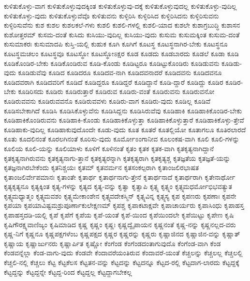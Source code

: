 {ಕುಳಿತುಕೊಳ್ಳು-ವಾಗ
ಕುಳಿತುಕೊಳ್ಳುವುದಕ್ಕಿಂತ
ಕುಳಿತುಕೊಳ್ಳುವು-ದಕ್ಕೆ
ಕುಳಿತುಕೊಳ್ಳುವುದಲ್ಲ
ಕುಳಿತುಕೊಳ್ಳು-ವುದಿಲ್ಲ
ಕುಳಿತುಕೊಳ್ಳು-ವುದು
ಕುಳಿತುಕೊಳ್ಳುವೆವೊ
ಕುಳಿತುವನು
ಕುಳ್ಳಿರಿಸಿ
ಕುಳ್ಳಿರಿಸಿದ
ಕುಳ್ಳಿರಿಸಿದನು
ಕುಳ್ಳಿರಿಸುವನು
ಕುಳ್ಳಿರಿಸುವೆನು
ಕುಶ
ಕುಶಲ
ಕುಶಲಕಲೆ-ಗಳು
ಕುಶಲಿ
ಕುಶಲಿ-ಗಳಲ್ಲಿ
ಕುಶಲಿ-ಯಾದ
ಕುಶಲೇ
ಕುಶಾಗ್ರಬುದ್ಧಿ
ಕುಶಾಸನ
ಕುಶೋತ್ತರಮ್
ಕುಸಮ-ದಂತೆ
ಕುಸಿದು
ಕುಸಿಯು-ವುದಿಲ್ಲ
ಕುಸಿಯು-ವುದು
ಕುಸುಮ
ಕುಸುಮಕ್ಕಿಂತ
ಕುಸುಮ-ದಂತೆ
ಕುಸುಮಾಕರಃ
ಕುಸುಮಾದಪಿ
ಕುಸ್ತಿ-ಯಲ್ಲಿ
ಕುಹುಕ
ಕೂಗಿ
ಕೂಗಿಗೆ
ಕೂಟಸ್ಥ
ಕೂಟಸ್ಥನಾಗಿರ-ಬೇಕು
ಕೂಟಸ್ಥನೂ
ಕೂಟಸ್ಥಮಚಲಂ
ಕೂಟಸ್ಥವೂ
ಕೂಟಸ್ಥೋ
ಕೂಟಸ್ಥೋಽಕ್ಷರ
ಕೂಡ
ಕೂಡದು
ಕೂಡಬಾರದು
ಕೂಡಲೆ
ಕೂಡಾ
ಕೂಡಿ
ಕೂಡಿಕೊಂಡಿರ-ಬೇಕು
ಕೂಡಿಕೊಂಡಿರುವ
ಕೂಡಿ-ಕೊಂಡು
ಕೂಡಿಟ್ಟರೂ
ಕೂಡಿಟ್ಟುಕೊಂಡಿರು
ಕೂಡಿಡುವನು
ಕೂಡಿಡು-ವುದು
ಕೂಡಿಡುವೆವು
ಕೂಡಿದ
ಕೂಡಿದರೂ
ಕೂಡಿದವ-ನಾಗಿ
ಕೂಡಿದವನಾದರೆ
ಕೂಡಿದವನು
ಕೂಡಿದವನೂ
ಕೂಡಿದವರಾಗಿ
ಕೂಡಿದವರಿಗೆ
ಕೂಡಿದೆ
ಕೂಡಿದ್ದರೂ
ಕೂಡಿದ್ದರೆ
ಕೂಡಿದ್ದಾನೆ
ಕೂಡಿ-ದ್ದಾರೆ
ಕೂಡಿದ್ದು
ಕೂಡಿರ
ಕೂಡಿರ-ಬೇಕು
ಕೂಡಿರಿಸದು
ಕೂಡಿರು
ಕೂಡಿರುತ್ತಾರೆ
ಕೂಡಿರುವ
ಕೂಡಿರು-ವಂತೆ
ಕೂಡಿರುವನು
ಕೂಡಿರುವನೋ
ಕೂಡಿರುವವನು
ಕೂಡಿರುವವನೊ
ಕೂಡಿರುವವಳು
ಕೂಡಿರು-ವಾಗ
ಕೂಡಿರು-ವುದು
ಕೂಡಿಲ್ಲ
ಕೂಡಿವೆ
ಕೂಡಿಸಬೇಕಾಗಿದೆ
ಕೂಡಿಸಿ
ಕೂಡಿಸಿಕೊಳ್ಳುವೆನು
ಕೂಡಿಸಿದ್ದನು
ಕೂಡಿಸಿರುವೆವು
ಕೂಡಿಹಾಕಿ
ಕೂಡಿಹಾಕಿಕೊಂಡಿರ-ಬೇಕು
ಕೂಡಿಹಾಕಿಕೊಂಡಿರುವನು
ಕೂಡಿಹಾಕಿ-ಕೊಂಡು
ಕೂಡಿಹಾಕಿಕೊಳ್ಳುತ್ತಾ
ಕೂಡಿಹಾಕಿಕೊಳ್ಳುತ್ತಾರೆ
ಕೂಡಿಹಾಕಿಕೊಳ್ಳು-ತ್ತೇವೆ
ಕೂಡಿಹಾಕು-ವುದಿಲ್ಲ
ಕೂಡಿಹಾಕುವುದೊಂದೇ
ಕೂಡು-ವುದು
ಕೂತ
ಕೂತರೆ
ಕೂತಲ್ಲಿಯೋ
ಕೂತಾಗಲೂ
ಕೂತಿರಲಾರದೆ
ಕೂತು
ಕೂದಲಿನಂತೆ
ಕೂರಲಗಿನಂತೆ
ಕೂರಿಸು-ವುದು
ಕೂರ್ಮೋಽಂಗಾನೀವ
ಕೂಲಂಕಷ-ವಾಗಿ
ಕೂಲಿ
ಕೂಲಿ-ಗಳನ್ನು
ಕೂಲಿಯ
ಕೂಲಿ-ಯನ್ನು
ಕೂಲಿಯಾಳು
ಕೂಳಿಗೆ
ಕೂಳಿನಂತೆ
ಕೃತಂ
ಕೃತಕ
ಕೃತಕ-ವಾಗಿ
ಕೃತಕೃತ್ಯನಾಗಿದ್ದಾನೆ
ಕೃತಕೃತ್ಯನಾಗಿರುವನು
ಕೃತಕೃತ್ಯನಾಗು-ತ್ತಾನೆ
ಕೃತಕೃತ್ಯರನ್ನಾಗಿ
ಕೃತಕೃತ್ಯರಾಗಿ
ಕೃತಕೃತ್ಯಶ್ಚ
ಕೃತಜ್ಞತೆಯ
ಕೃತಜ್ಞತೆ-ಯನ್ನು
ಕೃತಜ್ಞನಾಗಿರಬೇಕೆಂದು
ಕೃತನಿಶ್ಚಯಃ
ಕೃತಮ್
ಕೃತವರ್ಮನ
ಕೃತಸಂಕಲ್ಪರಾಗಿ
ಕೃತಾಂಜಲಿರಭಾಷತ
ಕೃತಾಂಜಲಿರ್ವೇಪಮಾನಃ
ಕೃತಾಂತೇ
ಕೃತಾರ್ಥ
ಕೃತಾರ್ಥನಾಗು-ತ್ತೇನೆ
ಕೃತಾರ್ಥನಾದೆ
ಕೃತಾರ್ಥರಾಗಿ
ಕೃತೇನಾರ್ಥೋ
ಕೃತ್ಯಕೃತ್ಯನೂ
ಕೃತ್ಯಕ್ಕಿಂತ
ಕೃತ್ಯ-ಗಳನ್ನು
ಕೃತ್ಯದ
ಕೃತ್ಯ-ವನ್ನು
ಕೃತ್ವಾ
ಕೃತ್ವಾಪಿ
ಕೃತ್ಸ್ನ
ಕೃತ್ಸ್ನಂ
ಕೃತ್ಸ್ನಮಧರ್ಮೋಭಿಭವತ್ಯುತ
ಕೃತ್ಸ್ನಮಧ್ಯಾತ್ಮಂ
ಕೃತ್ಸ್ನಮವಶಂ
ಕೃತ್ಸ್ನಮೇಕಾಂಶೇನ
ಕೃತ್ಸ್ನವದೇಕಸ್ಮಿನ್
ಕೃತ್ಸ್ನವಿನ್ನ
ಕೃತ್ಸ್ನಸ್ಯ
ಕೃಪ
ಕೃಪಣರು
ಕೃಪಣಾಃ
ಕೃಪನೇ
ಕೃಪಯಾ
ಕೃಪಯಾವಿಷ್ಟಮಶ್ರುಪೂರ್ಣಾಕುಲೇಕ್ಷಣಮ್
ಕೃಪಶ್ಚ
ಕೃಪಾಕಟಾಕ್ಷವೇ
ಕೃಪಾಚಾರ್ಯರು
ಕೃಪಾಸಿಂಧು
ಕೃಪಾಹಸ್ತ
ಕೃಪಾಹಸ್ತದಡಿ-ಯಲ್ಲಿ
ಕೃಪೆ
ಕೃಪೆಗೆ
ಕೃಪೆಯ
ಕೃಪೆ-ಯಂತೆ
ಕೃಪೆ-ಯಿಂದ
ಕೃಪೆಯಿಂದಲೇ
ಕೃಪೆಯಿಟ್ಟು
ಕೃಪೇಣ
ಕೃಷಿ
ಕೃಷಿಗೌರಕ್ಷ್ಯವಾಣಿಜ್ಯಂ
ಕೃಷಿಮಾಡಿದ
ಕೃಷ್ಣ
ಕೃಷ್ಣಂ
ಕೃಷ್ಣಃ
ಕೃಷ್ಣದ್ವೈಪಾಯನ
ಕೃಷ್ಣನಂತೆ
ಕೃಷ್ಣ-ನನ್ನು
ಕೃಷ್ಣನಲ್ಲದ-ವರು
ಕೃಷ್ಣ-ನಿಗೆ
ಕೃಷ್ಣನೂ
ಕೃಷ್ಣಪಕ್ಷಗಳೆಂಬ
ಕೃಷ್ಣಪಕ್ಷದ
ಕೃಷ್ಣರ
ಕೃಷ್ಣರನ್ನು
ಕೃಷ್ಣರು
ಕೃಷ್ಣಾಜಿನದ
ಕೃಷ್ಣಾಜಿನ-ವನ್ನು
ಕೃಷ್ಣಾತ್
ಕೃಷ್ಣಾಯ
ಕೃಷ್ಣಾರ್ಜುನರು
ಕೃಷ್ಣಾರ್ಪಿತ
ಕೃಷ್ಣೋ
ಕೆಂಗೆಂಡ
ಕೆಂಗೆಂಡದಂತಾಗುವುದೊ
ಕೆಂಗೆಂಡ-ವಾಗಿ
ಕೆಂಡ
ಕೆಂಡವನ್ನೆಲ್ಲಾ
ಕೆಂಡ-ವಾಗು-ವುದು
ಕೆಂಡವೇ
ಕೆಂದಾವರೆಯಂತಿರುವ
ಕೆಂದಾವರೆ-ಯಂತೆ
ಕೆಚ್ಚಲನ್ನು
ಕೆಚ್ಚಲಲ್ಲ
ಕೆಚ್ಚಲಲ್ಲಿ
ಕೆಚ್ಚಲಿ-ನಲ್ಲಿ
ಕೆಚ್ಚಲು
ಕೆಟ್ಟ
ಕೆಟ್ಟಕೆಲಸ
ಕೆಟ್ಟತನ-ವನ್ನು
ಕೆಟ್ಟದನ್ನು
ಕೆಟ್ಟದನ್ನೂ
ಕೆಟ್ಟದ-ರಲ್ಲಿ
ಕೆಟ್ಟದಾಗ-ಲಾರದು
ಕೆಟ್ಟದ್ದಕ್ಕೆ
ಕೆಟ್ಟದ್ದನ್ನು
ಕೆಟ್ಟದ್ದನ್ನೇ
ಕೆಟ್ಟದ್ದ-ರಿಂದ
ಕೆಟ್ಟದ್ದಲ್ಲ
ಕೆಟ್ಟದ್ದಾಗಬೇಕಲ್ಲ
}
